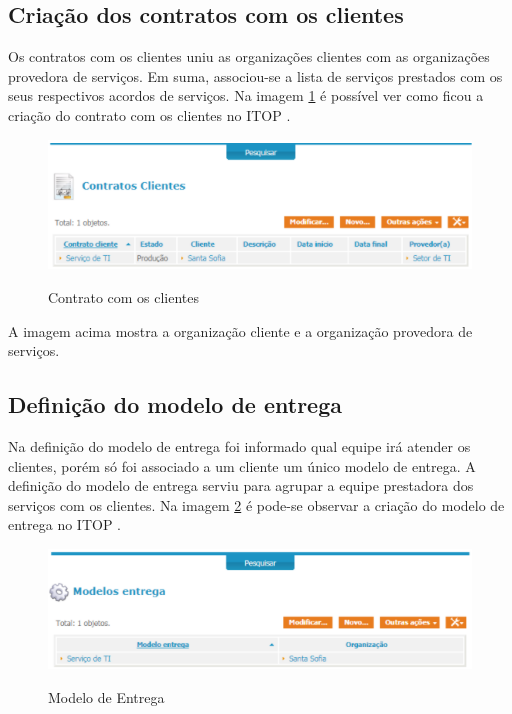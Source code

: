 \documentclass[eso]{bcc}
\begin{document}
\subsection{Criação dos contratos com os clientes }

Os contratos com os clientes uniu as organizações clientes com as organizações provedora de serviços. Em suma, associou-se a lista de serviços prestados com os seus respectivos acordos de serviços. Na imagem \ref{criacao} é possível ver como ficou a criação do contrato com os clientes no ITOP .

\newpage

\begin{figure}[!h]
\centering
\caption[Contrato com os clientes]{Contrato com os clientes}
\includegraphics[scale=0.9]{Figuras/itop5.png}
\label{criacao}
\end{figure}

A imagem acima mostra a organização cliente e a organização provedora de serviços.

\subsection{Definição do modelo de entrega}

Na definição do modelo de entrega foi informado qual equipe irá atender os  clientes, porém só foi associado a um cliente um único modelo de entrega. A definição do modelo de entrega serviu para agrupar a equipe prestadora dos serviços com os clientes. Na imagem \ref{entrega} é pode-se observar a criação do modelo de entrega no ITOP .

\newpage

\begin{figure}[!h]
\centering
\caption[Modelo de Entrega]{Modelo de Entrega}
\includegraphics[scale=0.9]{Figuras/itop6.png}
\label{entrega}
\end{figure}
\end{document}
